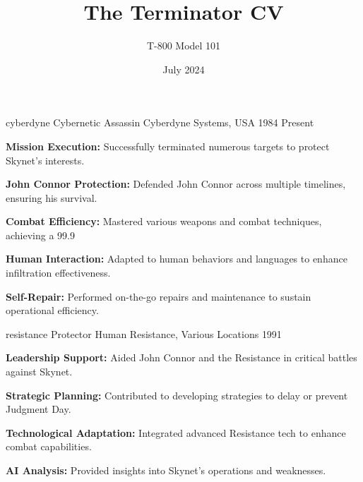 \documentclass[
    a4paper, 
    fontsize=11pt, 
    pagemargin=.8in,
    timelineindent=1cm,
    smallskip=.4cm,
    bigskip=.8cm,
    primarycolor=E50914,
    backgroundcolor=000000,
    textprimarycolor=FFFFFF,
    textsecondarycolor=BBBBBB,
]{concise-cv}
\title{The Terminator \dashv CV}
\date{July 2024}
\author{T-800 Model 101}
\begin{document}
\begin{cv}

    \myheader
    

    \jobentry
        {cyberdyne}
        {Cybernetic Assassin \textendash\space Cyberdyne Systems, USA}
        {1984 \textendash\space Present}
        {
            \begin{cvEnum}
                \item \textbf{Mission Execution:} Successfully terminated numerous targets to protect Skynet's interests.
                \item \textbf{John Connor Protection:} Defended John Connor across multiple timelines, ensuring his survival.
                \item \textbf{Combat Efficiency:} Mastered various weapons and combat techniques, achieving a 99.9%
                \item \textbf{Human Interaction:} Adapted to human behaviors and languages to enhance infiltration effectiveness.
                \item \textbf{Self-Repair:} Performed on-the-go repairs and maintenance to sustain operational efficiency.
            \end{cvEnum}
        }
    \jobentry
        {resistance}
        {Protector \textendash\space Human Resistance, Various Locations}
        {1991 \textendash{}}
        {
            \begin{cvEnum}
                \item \textbf{Leadership Support:} Aided John Connor and the Resistance in critical battles against Skynet.
                \item \textbf{Strategic Planning:} Contributed to developing strategies to delay or prevent Judgment Day.
                \item \textbf{Technological Adaptation:} Integrated advanced Resistance tech to enhance combat capabilities.
                \item \textbf{AI Analysis:} Provided insights into Skynet's operations and weaknesses.

\end{cvEnum}}
\end{cv}
\end{document}
